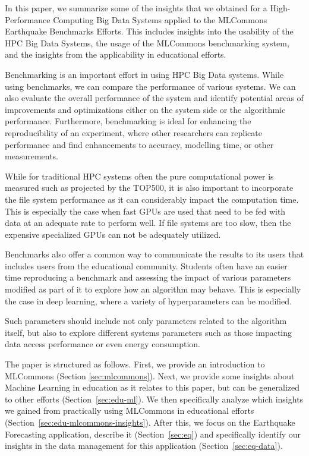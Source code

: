 \documentclass[utf8]{FrontiersinVancouver} %
\begin{document}
In this paper, we summarize some of the insights that we obtained for
a High-Performance Computing Big Data Systems applied to the
MLCommons Earthquake Benchmarks Efforts. This includes
insights into the usability of the HPC Big Data Systems, the usage of
the MLCommons benchmarking system, and the insights from the applicability in
educational efforts.

Benchmarking is an important effort in using HPC Big Data systems.
While using benchmarks, we can compare the performance of various
systems. We can also evaluate the overall performance of the system
and identify potential areas of improvements and optimizations
either on the system side or the algorithmic performance. Furthermore,
benchmarking is ideal for enhancing the reproducibility of an experiment,
where other researchers can replicate performance and find enhancements
to accuracy, modelling time, or other measurements.

While for traditional HPC systems often the pure
computational power is measured such as projected by the TOP500, it is
also important to incorporate the file system performance as it can
considerably impact the computation time. This is especially the case
when fast GPUs are used that need to be fed with data at an adequate
rate to perform well. If file systems are too slow, then the expensive
specialized GPUs can not be adequately utilized.

Benchmarks also offer a common way to communicate the results to its
users that includes users from the educational community. Students
often have an easier time reproducing a benchmark and assessing the
impact of various parameters modified as part of it to explore how an
algorithm may behave. This is especially the case in deep learning,
where a variety of hyperparameters can be modified.

Such parameters should include not only parameters related to
the algorithm itself, but also to explore different systems parameters
such as those impacting data access performance or even energy
consumption.

The paper is structured as follows. First, we provide an introduction to
MLCommons (Section \ref{sec:mlcommons}).  Next, we provide some
insights about Machine Learning in education as it relates to this
paper, but can be generalized to other efforts
(Section~\ref{sec:edu-ml}). We then specifically analyze which
insights we gained from practically using MLCommons in educational
efforts (Section~\ref{sec:edu-mlcommons-insights}). After this, we
focus on the Earthquake Forecasting application, describe it
(Section~\ref{sec:eq}) and specifically identify our insights in the
data management for this application (Section~\ref{sec:eq-data}).
\end{document}
